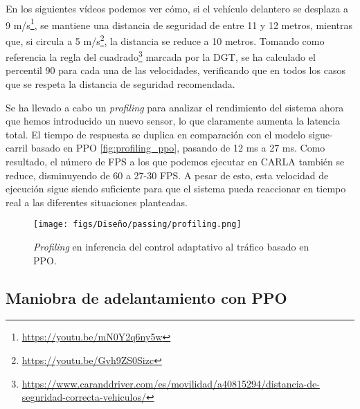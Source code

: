 En los siguientes vídeos podemos ver cómo, si el vehículo delantero se desplaza a 9 m/s\footnote{\url{https://youtu.be/mN0Y2q6ny5w}}, se mantiene una distancia de seguridad de entre 11 y 12 metros, mientras que, si circula a 5 m/s\footnote{\url{https://youtu.be/Gvh9ZS0Sizc}}, la distancia se reduce a 10 metros. Tomando como referencia la regla del cuadrado\footnote{\url{https://www.caranddriver.com/es/movilidad/a40815294/distancia-de-seguridad-correcta-vehiculos/}} marcada por la \ac{DGT},  se ha calculado el percentil 90 para cada una de las velocidades, verificando que en todos los casos que se respeta la distancia de seguridad recomendada.

Se ha llevado a cabo un \textit{profiling} para analizar el rendimiento del sistema ahora que hemos introducido un nuevo sensor, lo que claramente aumenta la latencia total. El tiempo de respuesta se duplica en comparación con el modelo sigue-carril basado en \ac{PPO} \ref{fig:profiling_ppo}, pasando de 12 ms a 27 ms. Como resultado, el número de \ac{FPS} a los que podemos ejecutar en CARLA también se reduce, disminuyendo de 60 a 27-30 \ac{FPS}. A pesar de esto, esta velocidad de ejecución sigue siendo suficiente para que el sistema pueda reaccionar en tiempo real a las diferentes situaciones planteadas.

\begin{figure}[ht]
\centering
\texttt{[image: figs/Diseño/passing/profiling.png]}
\caption{\textit{Profiling} en inferencia del control adaptativo al tráfico basado en \ac{PPO}.}
\label{fig:profiling_ppo_passing}
\end{figure}

\subsection{Maniobra de adelantamiento con PPO}

